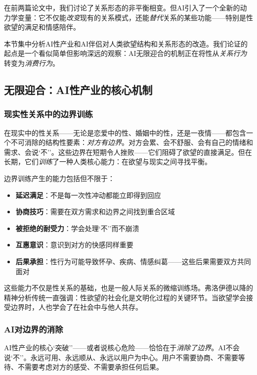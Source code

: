 \documentclass[12pt,a4paper]{ctexart}
\begin{document}
在前两篇论文中，我们讨论了关系形态的非平衡相变。但AI引入了一个全新的动力学变量：它不仅能\emph{改变}现有的关系模式，还能\emph{替代}关系的某些功能——特别是性欲望的满足和情感陪伴。

本节集中分析AI性产业和AI伴侣对人类欲望结构和关系形态的改造。我们论证的起点是一个看似简单但影响深远的观察：AI无限迎合的机制正在将性从\textit{关系行为}转变为\textit{消费行为}。

\subsection{无限迎合：AI性产业的核心机制}

\subsubsection{现实性关系中的边界训练}

在现实中的性关系——无论是恋爱中的性、婚姻中的性，还是一夜情——都包含一个不可消除的结构性要素：\textit{对方有边界}。对方会累、会不舒服、会有自己的情绪和需求、会说`不''。这些边界在短期令人挫败——它们阻碍了欲望的直接满足。但在长期，它们\textit{训练}了一种人类核心能力：在欲望与现实之间寻找平衡。

边界训练产生的能力包括但不限于：
\begin{itemize}
\item \textbf{延迟满足}：不是每一次性冲动都能立即得到回应
\item \textbf{协商技巧}：需要在双方需求和边界之间找到重合区域
\item \textbf{被拒绝的耐受力}：学会处理`不''而不崩溃
\item \textbf{互惠意识}：意识到对方的快感同样重要
\item \textbf{后果承担}：性行为可能导致怀孕、疾病、情感纠葛——这些后果需要双方共同面对
\end{itemize}

这些能力不仅是性关系的基础，也是一般人际关系的微缩训练场。弗洛伊德以降的精神分析传统一直强调：性欲望的社会化是文明化过程的关键环节。当欲望学会接受边界时，人也学会了在社会中与他人共存。

\subsubsection{AI对边界的消除}

AI性产业的核心`突破''——或者说核心危险——恰恰在于\textit{消除了边界}。AI不会说`不''。永远可用、永远顺从、永远以用户为中心。用户不需要协商、不需要等待、不需要考虑对方的感受、不需要承担任何后果。
\end{document}
